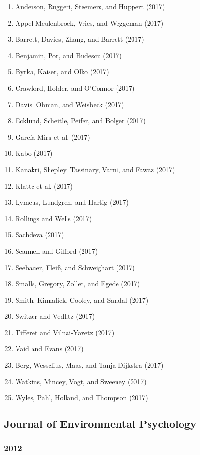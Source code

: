 \documentclass[english,man]{apa6}
\providecommand{\tightlist}{%
  \setlength{\itemsep}{0pt}\setlength{\parskip}{0pt}}
\begin{document}
\begin{enumerate}
\def\labelenumi{\arabic{enumi})}
\tightlist
\item
  Anderson, Ruggeri, Steemers, and Huppert (2017)
\item
  Appel-Meulenbroek, Vries, and Weggeman (2017)
\item
  Barrett, Davies, Zhang, and Barrett (2017)
\item
  Benjamin, Por, and Budescu (2017)
\item
  Byrka, Kaiser, and Olko (2017)
\item
  Crawford, Holder, and O'Connor (2017)
\item
  Davis, Ohman, and Weisbeck (2017)
\item
  Ecklund, Scheitle, Peifer, and Bolger (2017)
\item
  García-Mira et al. (2017)
\item
  Kabo (2017)
\item
  Kanakri, Shepley, Tassinary, Varni, and Fawaz (2017)
\item
  Klatte et al. (2017)
\item
  Lymeus, Lundgren, and Hartig (2017)
\item
  Rollings and Wells (2017)
\item
  Sachdeva (2017)
\item
  Scannell and Gifford (2017)
\item
  Seebauer, Fleiß, and Schweighart (2017)
\item
  Smalls, Gregory, Zoller, and Egede (2017)
\item
  Smith, Kinnafick, Cooley, and Sandal (2017)
\item
  Switzer and Vedlitz (2017)
\item
  Tifferet and Vilnai-Yavetz (2017)
\item
  Vaid and Evans (2017)
\item
  Berg, Wesselius, Maas, and Tanja-Dijkstra (2017)
\item
  Watkins, Mincey, Vogt, and Sweeney (2017)
\item
  Wyles, Pahl, Holland, and Thompson (2017)
\end{enumerate}

\subsection{Journal of Environmental
Psychology}\label{journal-of-environmental-psychology}

\subsubsection{2012}\label{section-22}
\end{document}
